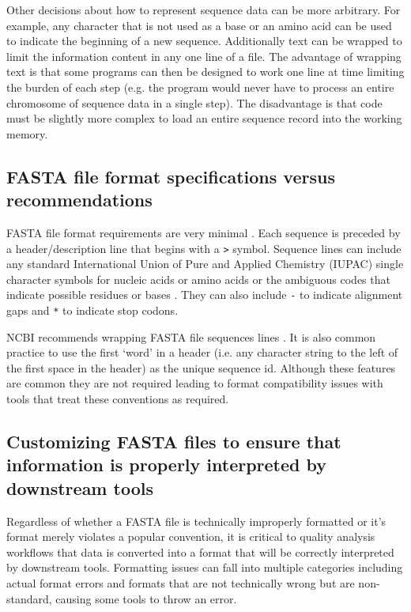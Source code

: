 \documentclass{bmcart}
\begin{document}
Other decisions about how to represent sequence data can be more arbitrary. For example, any character that is not used as a base or an amino acid can be used to indicate the beginning of a new sequence. Additionally text can be wrapped to limit the information content in any one line of a file. The advantage of wrapping text is that some programs can then be designed to work one line at time limiting the burden of each step (e.g. the program would never have to process an entire chromosome of sequence data in a single step). The disadvantage is that code must be slightly more complex to load an entire sequence record into the working memory.

\subsection{FASTA file format specifications versus recommendations}

FASTA file format requirements are very minimal \cite{FASTAformat}. Each sequence is preceded by a header/description line that begins with a \verb|>| symbol. Sequence lines can include any standard International Union of Pure and Applied Chemistry (IUPAC) single character symbols for nucleic acids or amino acids or the ambiguous codes that indicate possible residues or bases \cite{comm1970abbreviations}. They can also include \verb|-| to indicate alignment gaps and \verb|*| to indicate stop codons. 

NCBI recommends wrapping FASTA file sequences lines \cite{FASTAformat}. It is also common practice to use the first `word' in a header (i.e. any character string to the left of the first space in the header) as the unique sequence id. Although these features are common they are not required leading to format compatibility issues with tools that treat these conventions as required.

\subsection{Customizing FASTA files to ensure that information is properly interpreted by downstream tools}

Regardless of whether a FASTA file is technically improperly formatted or it's format merely violates a popular convention, it is critical to quality analysis workflows that data is converted into a format that will be correctly interpreted by downstream tools. Formatting issues can fall into multiple categories including actual format errors and formats that are not technically wrong but are non-standard,  causing some tools to throw an error. 
\end{document}
